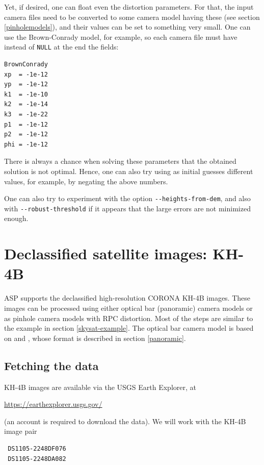 Yet, if desired, one can float even the distortion parameters. 
For that, the input camera files need to be converted
to some camera model having these (see section \ref{pinholemodels}), 
and their values can be set to something very small.
One can use the Brown-Conrady model, for example, so each camera file must have
instead of \texttt{NULL} at the end the fields:
\begin{verbatim}
BrownConrady
xp  = -1e-12
yp  = -1e-12
k1  = -1e-10
k2  = -1e-14
k3  = -1e-22
p1  = -1e-12
p2  = -1e-12
phi = -1e-12
\end{verbatim}

There is always a chance when solving these parameters that the obtained
solution is not optimal.  Hence, one can also try using as initial
guesses different values, for example, by negating the above numbers.

One can also try to experiment with the option
\texttt{-\/-heights-from-dem}, and also with
\texttt{-\/-robust-threshold} if it appears that the large errors are
not minimized enough.

\section{Declassified satellite images: KH-4B}
\label{kh4}

ASP supports the declassified high-resolution CORONA KH-4B images.
These images can be processed using either optical bar (panoramic)
camera models or as pinhole camera models with RPC distortion.
Most of the steps are similar to the example in section \ref{skysat-example}.
The optical bar camera model is based on \cite{schenk2003rigorous} and
\cite{sohn2004mathematical}, whose format is described in section
\ref{panoramic}.

\subsection{Fetching the data}

KH-4B images are available via the USGS Earth Explorer, at
\begin{center}
 \url{https://earthexplorer.usgs.gov/}
\end{center}

(an account is required to download the data). We will work with the KH-4B image pair

\begin{verbatim}
 DS1105-2248DF076
 DS1105-2248DA082
\end{verbatim}

